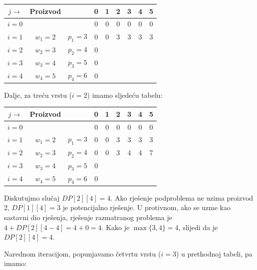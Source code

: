    \begin{table}[H]
 	\centering
 	\begin{tabular}{|c|cc|cccccc|}\hline
 		
 	$j\rightarrow$	& Proizvod   &              &	 	0	&1&	2	&3	&4	&5 \\ \hline
 		
 		$i=0$ & 	& 	    & 	    0	&0	&0	&0	&0	&0  \\
 		$i=1$ &	$w_1=2$	&$p_1=3$ &	0	&0 	&3 	&3 	&3 	&3\\ 
 		$i=2$ &	$w_2=3$	&$p_2=4$ &	0   &	& 	& 	&	&\\	 
 		$i=3$ &	$w_3=4$	&$p_3=5$ &	0	& 	& 	& 	& 	&\\ 
 		$i=4$ &	$w_4=5$ &$p_4=6$ &	0	& 	& 	& 	& 	&\\ \hline
 	\end{tabular}
 \end{table}
  
  Dalje, za treću vrstu ($i=2$) imamo sljedeću tabelu: 
  
   
  \begin{table}[H]
  	\centering
  	\begin{tabular}{|c|cc|cccccc|}\hline
  		
  		$j\rightarrow$	& Proizvod   &              &	 	0	&1&	2	&3	&4	&5 \\ \hline
  		
  		$i=0$ & 	& 	    & 	    0	&0	&0	&0	&0	&0  \\
  		$i=1$ &	$w_1=2$	&$p_1=3$ &	0	&0 	&3 	&3 	&3 	&3\\ 
  		$i=2$ &	$w_2=3$	&$p_2=4$ &	0   &0	&3 	&4 	&4	&7\\	 
  		$i=3$ &	$w_3=4$	&$p_3=5$ &	0	& 	& 	& 	& 	&\\ 
  		$i=4$ &	$w_4=5$ &$p_4=6$ &	0	& 	& 	& 	& 	&\\ \hline
  	\end{tabular}
  \end{table}
Diskutujmo slučaj $DP[2][4]=4$. Ako rješenje podproblema ne uzima proizvod 2, $DP[1][4]=3$ je potencijalno rješenje. U protivnom, ako se uzme kao sastavni dio rješenja, rješenje razmatranog problema je $4 + DP[2][4-4] = 4 + 0 = 4$. Kako je $\max\{3, 4\}= 4$, slijedi da je $DP[2][4] = 4$.


  Narednom iteracijom, popunjavamo četvrtu vrstu ($i=3$) u prethodnoj tabeli, pa imamo: 

